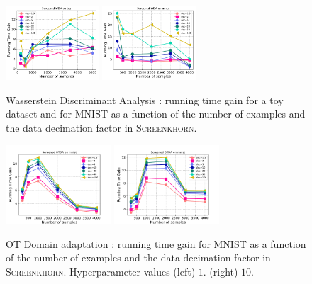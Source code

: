 \begin{figure}[t]
	\centering

	\includegraphics[width=0.31\textwidth]{./figs/wda_gain_toy.pdf}\hspace{1.5cm}
	\includegraphics[width=0.31\textwidth]{./figs/wda_gain_mnist.pdf}

	\caption{Wasserstein Discriminant Analysis : running time gain for a toy dataset and for MNIST as a function of the number of examples and the data decimation factor in \textsc{Screenkhorn}.}
	\label{fig:wda}
\end{figure}
\begin{figure}[t]
	\centering

	\includegraphics[width=0.35\textwidth]{./figs/da_gain_mnist_regcl1.pdf}\hspace{1cm}
	\includegraphics[width=0.35\textwidth]{./figs/da_gain_mnist_regcl10.pdf}
	\caption{OT Domain adaptation : running time gain  for MNIST as a function of the number of examples and the data decimation factor in \textsc{Screenkhorn}. Hyperparameter values (left) $1$. (right) $10$.}
	\label{fig:otda}
\end{figure}

